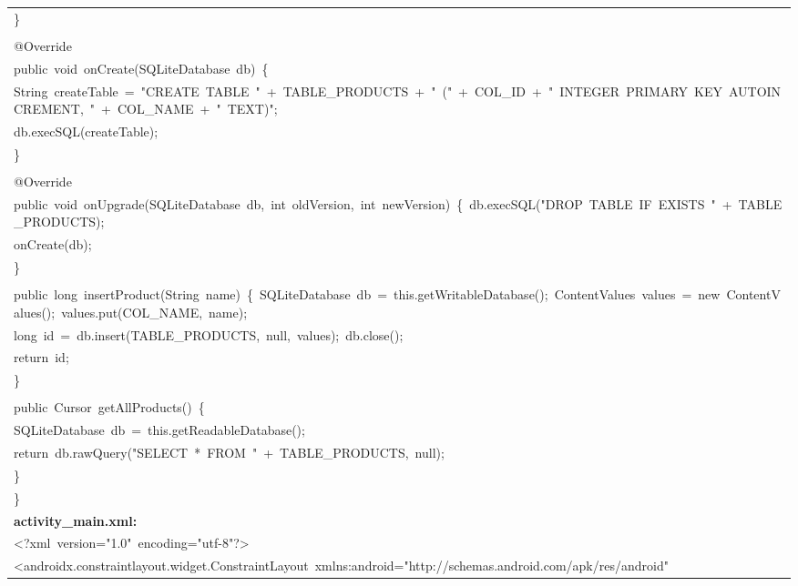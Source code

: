 \documentclass[a4paper,12pt]{article}
\begin{document}
\begin{longtable}{|p{}|}
{\ttfamily\small \}} \\
\strut \\
{\ttfamily\small @Override} \\
{\ttfamily\small public\ void\ onCreate(SQLiteDatabase\ db)\ \{} \\
{\ttfamily\small String\ createTable\ =\ "CREATE\ TABLE\ "\ +\ TABLE\_PRODUCTS\ +\ "\ ("\ +\ COL\_ID\ +\ "\ INTEGER\ PRIMARY\ KEY\ AUTOINCREMENT,\ "\ +\ COL\_NAME\ +\ "\ TEXT)";} \\
{\ttfamily\small db.execSQL(createTable);} \\
{\ttfamily\small \}} \\
\strut \\
{\ttfamily\small @Override} \\
{\ttfamily\small public\ void\ onUpgrade(SQLiteDatabase\ db,\ int\ oldVersion,\ int\ newVersion)\ \{\ db.execSQL("DROP\ TABLE\ IF\ EXISTS\ "\ +\ TABLE\_PRODUCTS);} \\
{\ttfamily\small onCreate(db);} \\
{\ttfamily\small \}} \\
\strut \\
{\ttfamily\small public\ long\ insertProduct(String\ name)\ \{\ SQLiteDatabase\ db\ =\ this.getWritableDatabase();\ ContentValues\ values\ =\ new\ ContentValues();\ values.put(COL\_NAME,\ name);} \\
{\ttfamily\small long\ id\ =\ db.insert(TABLE\_PRODUCTS,\ null,\ values);\ db.close();} \\
{\ttfamily\small return\ id;} \\
{\ttfamily\small \}} \\
\strut \\
{\ttfamily\small public\ Cursor\ getAllProducts()\ \{} \\
{\ttfamily\small SQLiteDatabase\ db\ =\ this.getReadableDatabase();} \\
{\ttfamily\small return\ db.rawQuery("SELECT\ *\ FROM\ "\ +\ TABLE\_PRODUCTS,\ null);} \\
{\ttfamily\small \}} \\
{\ttfamily\small \}} \\
\hline
\rule{0pt}{13pt}\textbf{activity\_main.xml:} \\
\hline
{\ttfamily\small \textless{}?xml\ version="1.0"\ encoding="utf-8"?\textgreater{}} \\
{\ttfamily\small \textless{}androidx.constraintlayout.widget.ConstraintLayout\ xmlns:android="http://schemas.android.com/apk/res/android"} \\

\end{longtable}
\end{document}
